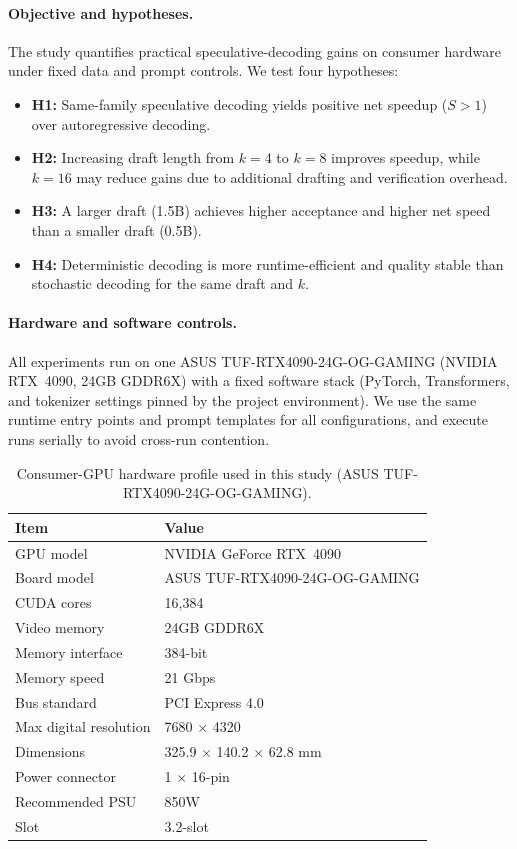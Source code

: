 \paragraph{Objective and hypotheses.}
The study quantifies practical speculative-decoding gains on consumer hardware
under fixed data and prompt controls.
We test four hypotheses:
\begin{itemize}
    \item \textbf{H1:} Same-family speculative decoding yields positive net speedup
        ($S>1$) over autoregressive decoding.
    \item \textbf{H2:} Increasing draft length from $k{=}4$ to $k{=}8$ improves
        speedup, while $k{=}16$ may reduce gains due to additional drafting
        and verification overhead.
    \item \textbf{H3:} A larger draft (1.5B) achieves higher acceptance and higher
        net speed than a smaller draft (0.5B).
    \item \textbf{H4:} Deterministic decoding is more runtime-efficient and quality
        stable than stochastic decoding for the same draft and $k$.
\end{itemize}

\paragraph{Hardware and software controls.}
All experiments run on one ASUS TUF-RTX4090-24G-OG-GAMING (NVIDIA RTX~4090,
24GB GDDR6X) with a fixed software
stack (PyTorch, Transformers, and tokenizer settings pinned by the project
environment). We use the same runtime entry points and prompt templates for
all configurations, and execute runs serially to avoid cross-run contention.

\begin{table}[t]
\centering
\caption{Consumer-GPU hardware profile used in this study (ASUS TUF-RTX4090-24G-OG-GAMING).}
\label{tab:hardware-profile}
\small
\begin{tabular}{l l}
\hline
\textbf{Item} & \textbf{Value} \\
\hline
GPU model & NVIDIA GeForce RTX~4090 \\
Board model & ASUS TUF-RTX4090-24G-OG-GAMING \\
CUDA cores & 16{,}384 \\
Video memory & 24GB GDDR6X \\
Memory interface & 384-bit \\
Memory speed & 21 Gbps \\
Bus standard & PCI Express 4.0 \\
Max digital resolution & 7680 \(\times\) 4320 \\
Dimensions & 325.9 \(\times\) 140.2 \(\times\) 62.8 mm \\
Power connector & 1 \(\times\) 16-pin \\
Recommended PSU & 850W \\
Slot & 3.2-slot \\
\hline
\end{tabular}
\end{table}

